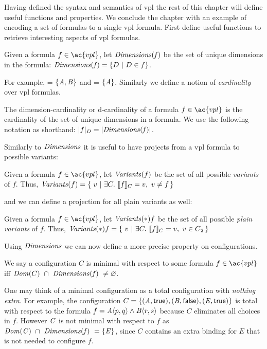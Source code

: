 \label{section:vpl:formalism}
%
Having defined the syntax and semantics of \ac{vpl} the rest of this chapter
will define useful functions and properties. We conclude the chapter with an
example of encoding a set of \pl{} formulas to a single \ac{vpl} formula.
%
First define useful functions to retrieve interesting aspects of \ac{vpl}
formulas.

\begin{definition}[Dimensions]
  Given a formula $f \in \ac{vpl}$, let $\mathit{Dimensions(f)}$ be the set of unique
  dimensions in the formula:  $\mathit{Dimensions(f)} = \{ D\ |\ D \in f \}$.
\end{definition}

For example,  = $\{\mathit{A,B}\}$ and
 = $\{\mathit{A}\}$.
%
Similarly we define a notion of \emph{cardinality} over \ac{vpl} formulas.
%
\begin{definition}
  The dimension-cardinality or d-cardinality of a formula $f \in \ac{vpl}$ is
  the cardinality of the set of unique dimensions in a formula. We use the
  following notation as shorthand: $|f|_{D} = |{\mathit{Dimensions(f)}}|$.
\end{definition}

Similarly to $\mathit{Dimensions}$ it is useful to have projects from a \ac{vpl}
formula to possible variants:
%
\begin{definition}[Variants]
  Given a formula $f \in \ac{vpl}$, let $\mathit{Variants}(f)$ be the set of all
  possible \emph{variants} of $f$. Thus, $\variants{f} = \{\ v\ |\ \exists
  C.\ \sem[C]{f} = v,\ v \neq f \,\}$
\end{definition}
%
and we can define a projection for all plain variants as well:
%
\begin{definition}[\pl{} Variants]
  Given a formula $f \in \ac{vpl}$, let $\mathit{Variants}(*){f}$ be the set of all
  possible \emph{plain variants} of $f$. Thus, $\variants*{f} = \{\ v\ |\ \exists C.\
  \sem[C]{f} = v,\ v \in \pl{} \,\}$
\end{definition}
%
Using $\mathit{Dimensions}$ we can now define a more precise property on
configurations.
%
\begin{definition}
  We say a configuration $C$ is minimal with respect to some formula $f \in
  \ac{vpl}$ iff $\domain{C}\ \cap\ \kf{Dimensions(\kf{f})\ \neq \varnothing}$.
\end{definition}

One may think of a minimal configuration as a total configuration with
\emph{nothing extra}. For example, the configuration $C = \{\kf{(A,\true),
  (B,\false),(E,\true)}\}$ is total with respect to the formula $f =
\chc[A]{p,q}\wedge\chc[B]{r,s}$ because $C$ eliminates all choices in $f$.
However $\mathit{C}$ is not minimal with respect to $f$ as $\mathit{Dom(C)}\ \cap\
\mathit{Dimensions(\mathit{f})\ = \{\mathit{E}\}}$, since $C$ contains an extra binding for
$E$ that is not needed to configure $f$.

